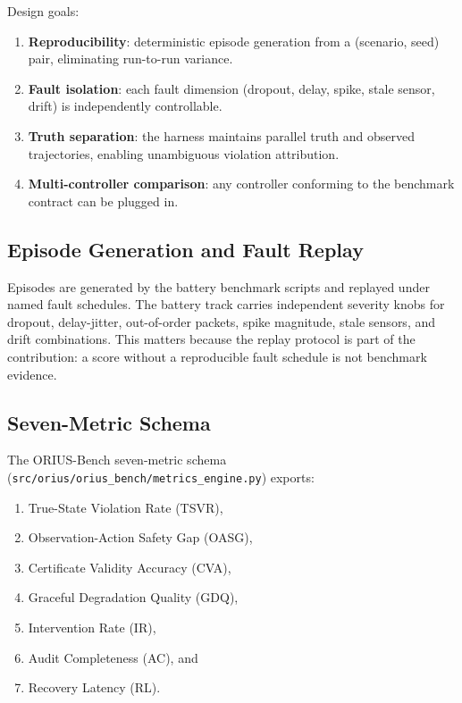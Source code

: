 Design goals:
\begin{enumerate}
  \item \textbf{Reproducibility}: deterministic episode generation from a
    (scenario, seed) pair, eliminating run-to-run variance.
  \item \textbf{Fault isolation}: each fault dimension (dropout, delay,
    spike, stale sensor, drift) is independently controllable.
  \item \textbf{Truth separation}: the harness maintains parallel truth
    and observed trajectories, enabling unambiguous violation attribution.
  \item \textbf{Multi-controller comparison}: any controller conforming
    to the benchmark contract can be plugged in.
\end{enumerate}

\subsection{Episode Generation and Fault Replay}

Episodes are generated by the battery benchmark scripts and replayed under
named fault schedules.  The battery track carries independent severity knobs
for dropout, delay-jitter, out-of-order packets, spike magnitude, stale
sensors, and drift combinations.  This matters because the replay protocol is
part of the contribution: a score without a reproducible fault schedule is
not benchmark evidence.

\subsection{Seven-Metric Schema}

The ORIUS-Bench seven-metric schema
(\texttt{src/orius/orius\_bench/metrics\_engine.py}) exports:

\begin{enumerate}
  \item True-State Violation Rate (TSVR),
  \item Observation-Action Safety Gap (OASG),
  \item Certificate Validity Accuracy (CVA),
  \item Graceful Degradation Quality (GDQ),
  \item Intervention Rate (IR),
  \item Audit Completeness (AC), and
  \item Recovery Latency (RL).
\end{enumerate}

